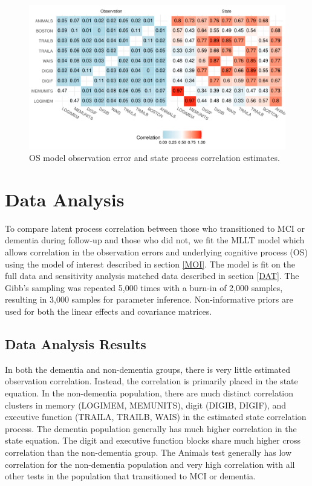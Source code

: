 \documentclass[
]{article}
\begin{document}
\begin{figure}
\centering
\includegraphics{Master_files/figure-latex/unnamed-chunk-35-1.pdf}
\caption{\label{fig:unnamed-chunk-35}OS model observation error and state process correlation estimates.}
\end{figure}

\hypertarget{data-analysis}{%
\section{Data Analysis}\label{data-analysis}}

To compare latent process correlation between those who transitioned to MCI or dementia during follow-up and those who did not, we fit the MLLT model which allows correlation in the observation errors and underlying cognitive process (OS) using the model of interest described in section \ref{MOI}. The model is fit on the full data and sensitivity analysis matched data described in section \ref{DAT}. The Gibb's sampling was repeated 5,000 times with a burn-in of 2,000 samples, resulting in 3,000 samples for parameter inference. Non-informative priors are used for both the linear effects and covariance matrices.

\hypertarget{data-analysis-results}{%
\subsection{Data Analysis Results}\label{data-analysis-results}}

In both the dementia and non-dementia groups, there is very little estimated observation correlation. Instead, the correlation is primarily placed in the state equation. In the non-dementia population, there are much distinct correlation clusters in memory (LOGIMEM, MEMUNITS), digit (DIGIB, DIGIF), and executive function (TRAILA, TRAILB, WAIS) in the estimated state correlation process. The dementia population generally has much higher correlation in the state equation. The digit and executive function blocks share much higher cross correlation than the non-dementia group. The Animals test generally has low correlation for the non-dementia population and very high correlation with all other tests in the population that transitioned to MCI or dementia.
\end{document}
